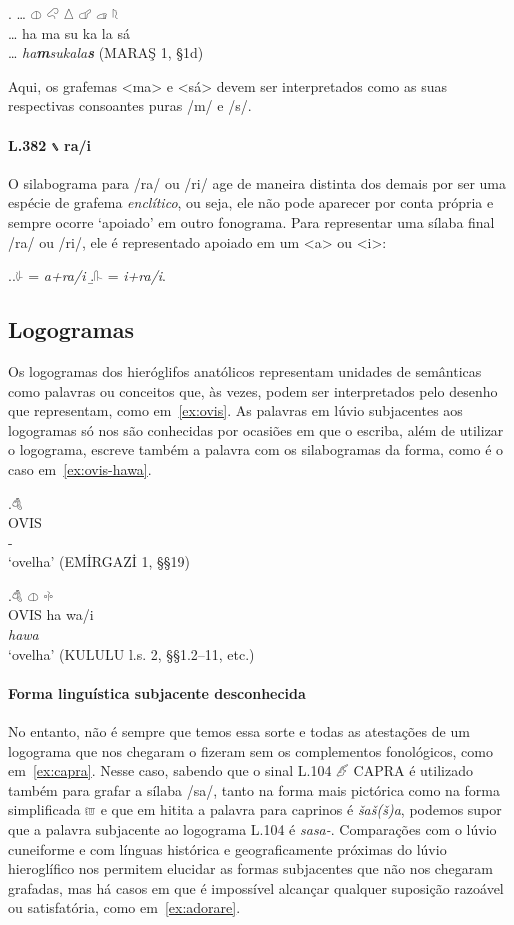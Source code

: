 \exg. \ldots{} \Large 𔓷 \Large 𔒅 \Large 𔖢 \Large 𔗧 \Large 𔓊 \Large 𔗦\\
\ldots{} ha ma su ka la sá\\
\ldots{} \emph{ha\textbf{m}sukala\textbf{s}} (MARAŞ 1, §1d)

Aqui, os grafemas <ma> e <sá> devem ser interpretados como as suas respectivas
consoantes puras /m/ e /s/.

\paragraph{L.382 𔖲 ra\slash{}i} O silabograma para /ra/ ou /ri/ age de maneira
distinta dos demais por ser uma espécie de grafema \emph{enclítico}, ou seja,
ele não pode aparecer por conta própria e sempre ocorre `apoiado' em outro
fonograma.
Para representar uma sílaba final /ra/ ou /ri/, ele é representado apoiado em um
<a> ou <i>:

\ex.\a.{\Large 𔗸} = \emph{a+ra\slash{}i}
\b.{\Large 𔓰} = \emph{i+ra\slash{}i}.


\subsection{Logogramas}

Os logogramas dos hieróglifos anatólicos representam unidades de semânticas
como palavras ou conceitos que, às vezes, podem ser interpretados pelo
desenho que representam, como em~\ref{ex:ovis}.
As palavras em lúvio subjacentes aos logogramas só nos são conhecidas por
ocasiões em que o escriba, além de utilizar o logograma, escreve também a
palavra com os silabogramas da forma, como é o caso em~\ref{ex:ovis-hawa}.

\exg.\label{ex:ovis}\Large 𔒇\\
OVIS\\
-\\
`ovelha' (EMİRGAZİ 1, §§19)

\exg.\label{ex:ovis-hawa}\Large 𔒇 \Large 𔓷 \Large 𔗬\\
OVIS ha wa/i\\
\emph{hawa}\\
`ovelha' (KULULU l.s. 2, §§1.2–11, etc.)


\paragraph{Forma linguística subjacente desconhecida}
No entanto, não é sempre que temos essa sorte e todas as atestações de um
logograma que nos chegaram o fizeram sem os complementos fonológicos, como
em~\ref{ex:capra}. Nesse caso, sabendo que o sinal L.104 𔑶 CAPRA é utilizado
também para grafar a sílaba /sa/, tanto na forma mais pictórica como na forma
simplificada 𔑷 e que em hitita a palavra para caprinos é \emph{šaš{(š)}a}, podemos
supor que a palavra subjacente ao logograma L.104 é \emph{sasa-}.
Comparações com o lúvio cuneiforme e com línguas histórica e
geograficamente próximas do lúvio hieroglífico nos permitem elucidar as formas
subjacentes que não nos chegaram grafadas, mas há casos em que é impossível
alcançar qualquer suposição razoável ou satisfatória, como em~\ref{ex:adorare}.

